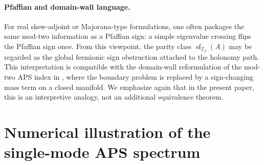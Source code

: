 \documentclass[11pt]{article}
\theoremstyle{definition}
\numberwithin{equation}{section}
\begin{document}
\paragraph{Pfaffian and domain-wall language.}
For real skew-adjoint or Majorana-type formulations, one often packages the same
mod-two information as a Pfaffian sign: a simple eigenvalue crossing flips the
Pfaffian sign once. From this viewpoint, the parity class
\(\operatorname{sf}_{\mathbb Z_2}(A)\) may be regarded as the global fermionic
sign obstruction attached to the holonomy path. This interpretation is
compatible with the domain-wall reformulation of the mod-two APS index in
\cite{FukayaFurutaMatsukiMatsuoOnogiYamaguchiYamashita2022}, where the
boundary problem is replaced by a sign-changing mass term on a closed manifold.
We emphasize again that in the present paper, this is an interpretive analogy,
not an additional equivalence theorem.



































































\appendix
\section{Numerical illustration of the single-mode APS spectrum}
\label{Appendix:A}
\end{document}
